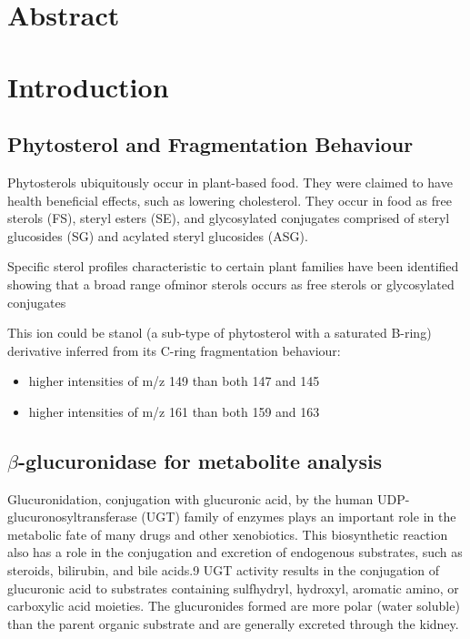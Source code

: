 \section{Abstract}

\section{Introduction}
\subsection{Phytosterol and Fragmentation Behaviour}
Phytosterols ubiquitously occur in plant-based food\cite{sterolmsms}. They were claimed to have health beneficial effects, such as lowering cholesterol. They occur in food as free sterols (FS), steryl esters (SE), and glycosylated conjugates comprised of steryl glucosides (SG) and acylated steryl glucosides (ASG).

Specific sterol profiles characteristic to certain plant families have been identified showing that a broad range ofminor sterols occurs as free sterols or glycosylated conjugates

This ion could be stanol (a sub-type of phytosterol with a saturated B-ring) derivative inferred from its C-ring fragmentation behaviour: 
\begin{itemize}
	\item higher intensities of m/z 149 than both 147 and 145
	\item higher intensities of m/z 161 than both 159 and 163
\end{itemize}
 

\subsection{$\beta$-glucuronidase for metabolite analysis}
Glucuronidation, conjugation with glucuronic acid, by the human UDP-glucuronosyltransferase (UGT) family of enzymes plays an important role in the metabolic fate of many drugs and other xenobiotics. This biosynthetic reaction also has a role in the conjugation and excretion of endogenous substrates, such as steroids, bilirubin, and bile acids.9 UGT activity results in the conjugation of glucuronic acid to substrates containing sulfhydryl, hydroxyl, aromatic amino, or carboxylic acid moieties. The glucuronides formed are more polar (water soluble) than the parent organic substrate and are generally excreted through the kidney.





